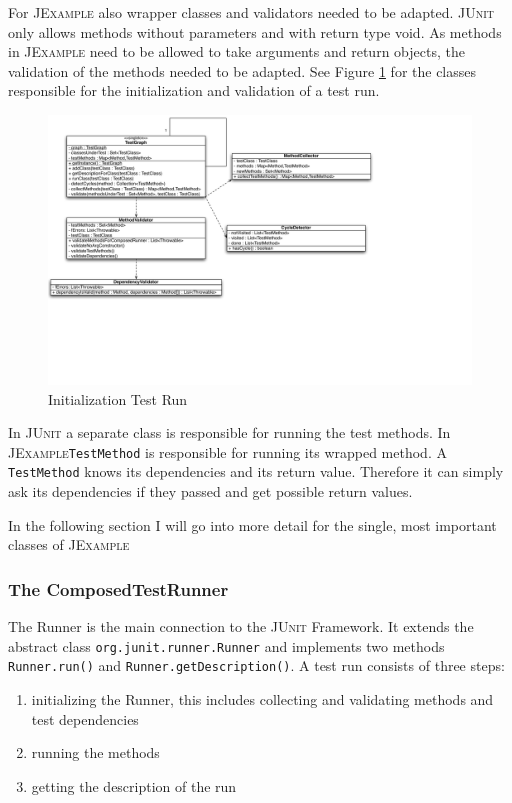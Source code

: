 \documentclass[11pt]{article}
\newcommand{\JUnit}{\textsc{JUnit}\xspace}
\newcommand{\JExample}{\textsc{JExample}\xspace}
\begin{document}
For \JExample also wrapper classes and validators needed to be adapted. \JUnit only allows methods without parameters and with return type void. As methods in \JExample need to be allowed to take arguments and return objects, the validation of the methods needed to be adapted. See Figure \ref{fig:classDiagInit} for the classes responsible for the initialization and validation of a test run.

\begin{figure}[htbp]
 \includegraphics[width=20.0cm]{classdiagramInit.pdf}
 \caption{Initialization Test Run}
 \label{fig:classDiagInit}
\end{figure}

In \JUnit a separate class is responsible for running the test methods. In \JExample \verb|TestMethod| is responsible for running its wrapped method. A \verb|TestMethod| knows its dependencies and its return value. Therefore it can simply ask its dependencies if they passed and get possible return values.

In the following section I will go into more detail for the single, most important classes of \JExample

\subsubsection{The ComposedTestRunner}

The Runner is the main connection to the \JUnit Framework. It extends the abstract class \verb|org.junit.runner.Runner| and implements two methods \verb|Runner.run()| and \verb|Runner.getDescription()|. A test run consists of three steps:
\begin{enumerate}
 \item initializing the Runner, this includes collecting and validating methods and test dependencies
 \item running the methods
 \item getting the description of the run
\end{enumerate}
\end{document}
